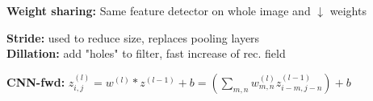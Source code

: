 \textbf{Weight sharing:} Same feature detector on whole image and $\downarrow$ weights\\

\textbf{Stride:} used to reduce size, replaces pooling layers\\
\textbf{Dillation:} add "holes" to filter, fast increase of rec. field\\

\textbf{CNN-fwd:} $z_{i,j}^{(l)} = w^{(l)} * z^{(l-1)} + b = (\sum_{m,n} w_{m,n}^{(l)} z_{i-m, j-n}^{(l-1)}) + b$

